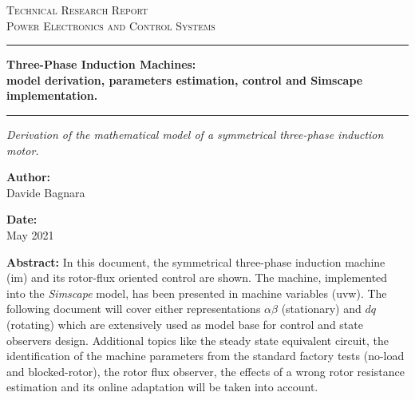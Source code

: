 \documentclass[12pt,a4paper]{scrartcl}
\newcommand{\DocCategory}{Technical Research Report}
\newcommand{\DocField}{Power Electronics and Control Systems}
\newcommand{\DocTitle}{%
	{\fontsize{20}{24}\selectfont\bfseries Three-Phase Induction Machines:} \\[16pt]
	{\fontsize{16}{20}\selectfont\bfseries model derivation, parameters estimation, control and Simscape implementation.}
}
\newcommand{\DocSubtitle}{%
	Derivation of the mathematical model of a symmetrical three-phase induction motor.
}
\newcommand{\DocAuthor}{Davide Bagnara}
\newcommand{\DocDate}{May 2021}
\newcommand{\DocAbstract}{%
	In this document, the symmetrical three-phase induction machine (im) and its rotor-flux oriented control are shown. The machine, implemented into the \textit{Simscape} model, has been presented in machine variables (uvw). The following document will cover either representations $\alpha\beta$ (stationary) and $dq$ (rotating) which are extensively used as model base for control and state observers design. Additional topics like the steady state equivalent circuit, the identification of the machine parameters from the standard factory tests (no-load and blocked-rotor), the rotor flux observer, the effects of a wrong rotor resistance estimation and its online adaptation will be taken into account.
}
\begin{document}
\titlepage
\begin{center}
	{\Large\scshape \DocCategory}\\[8pt]
	{\large\scshape \DocField}
\end{center}

\vspace{36pt}
\noindent\rule{\linewidth}{0.8pt}

\begin{center}
	\DocTitle
\end{center}

\vspace{4pt}
\noindent\rule{\linewidth}{2.2pt}

\begin{center}
	\begin{onehalfspace}
		{\large\itshape \DocSubtitle}
	\end{onehalfspace}
\end{center}

\vspace{36pt}

\begin{minipage}{0.92\linewidth}
	\noindent
	\begin{minipage}[t]{0.48\linewidth}
		\textbf{Author:}\\[2pt]
		\DocAuthor
	\end{minipage}%
	\hfill
	\begin{minipage}[t]{0.48\linewidth}
		\raggedleft
		\textbf{Date:}\\[2pt]
		\DocDate
	\end{minipage}
\end{minipage}
\vspace{36pt}

\begin{center}
	\begin{minipage}{0.85\linewidth}
		\footnotesize
		\begin{onehalfspace}
			\textbf{Abstract:} \DocAbstract
		\end{onehalfspace}
	\end{minipage}
\end{center}

\vfill
\end{document}
